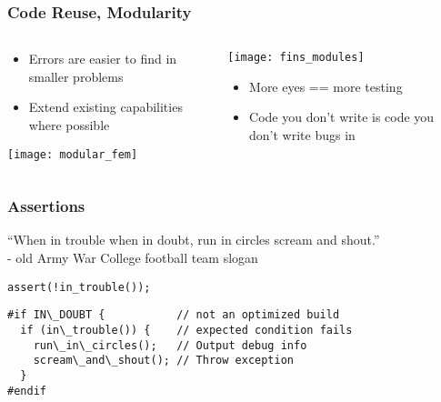 \begin{frame}
\frametitle{Code Reuse, Modularity}
\begin{columns}
\begin{column}{.5\textwidth}

\begin{itemize}
\item Errors are easier to find in smaller problems

\item Extend existing capabilities where possible
\end{itemize}

\begin{center}
\texttt{[image: modular\_fem]}
\end{center}

\end{column}

\begin{column}{.5\textwidth}
\begin{center}
\texttt{[image: fins\_modules]}
\end{center}

\begin{itemize}
\item More eyes == more testing

\item Code you don't write is code you don't write bugs in
\end{itemize}

\end{column}
\end{columns}

\end{frame}


\begin{frame}[fragile]
\frametitle{Assertions}

\vfill

``When in trouble when in doubt, run in circles scream and shout.''\\
- old Army War College football team slogan

\pause
\vfill

\begin{block}{\texttt{assert(!in\_trouble());}}

\begin{verbatim}
#if IN\_DOUBT {           // not an optimized build
  if (in\_trouble()) {    // expected condition fails
    run\_in\_circles();   // Output debug info
    scream\_and\_shout(); // Throw exception
  }
#endif
\end{verbatim}

\end{block}

\end{frame}



